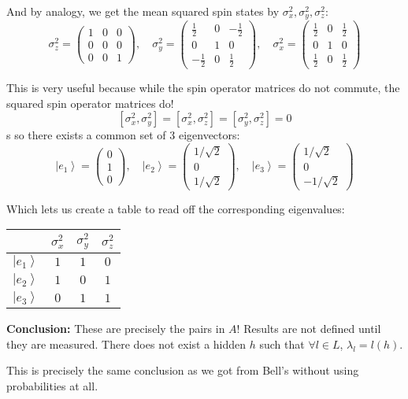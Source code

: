 \documentclass[12pt]{article}
\newcommand{\ket}[1]{\left\vert #1 \right\rangle}
\begin{document}
        And by analogy, we get the mean squared spin states by $\sigma_x^2, \sigma_y^2, \sigma_z^2$: 
        \[\sigma_z^2 = \begin{pmatrix}
            1 & 0 & 0\\
            0 & 0 & 0\\
            0 & 0 & 1
        \end{pmatrix}, \quad \sigma_y^2 = \begin{pmatrix}
            \frac{1}{2} & 0 & -\frac{1}{2}\\
            0 & 1 & 0\\
            -\frac{1}{2} & 0 & \frac{1}{2}
        \end{pmatrix}, \quad \sigma_x^2 = \begin{pmatrix}
            \frac{1}{2} & 0 & \frac{1}{2}\\
            0 & 1 & 0\\
            \frac{1}{2} & 0 & \frac{1}{2}
        \end{pmatrix}\]

        This is very useful because while the spin operator matrices do not commute, the squared spin operator matrices do!
        \[[\sigma^2_x, \sigma^2_y] = [\sigma^2_x, \sigma^2_z] = [\sigma^2_y, \sigma^2_z] = 0\]s
        so there exists a common set of $3$ eigenvectors: 
        \[\ket{e_1} = \begin{pmatrix}
            0\\1\\0
        \end{pmatrix}, \quad \ket{e_2} = \begin{pmatrix}
            1/\sqrt 2\\0\\1/\sqrt 2
        \end{pmatrix}, \quad \ket{e_3} =  \begin{pmatrix}
            1/\sqrt 2\\0\\ -1/\sqrt 2
        \end{pmatrix}\]

        Which lets us create a table to read off the corresponding eigenvalues:
        \begin{center}
            \begin{tabular*}{1.28in}{|c|ccc|}
                \hline 
                & $\sigma_x^2$ & $\sigma_y^2$ & $\sigma_z^2$\\
                \hline
                $\ket{e_1}$ & $1$ & $1$ & $0$\\
                $\ket{e_2}$ & $1$ & $0$ & $1$\\
                $\ket{e_3}$ & $0$ & $1$ & $1$\\
                \hline
            \end{tabular*}
        \end{center}

        \textbf{Conclusion:} These are precisely the pairs in $A$! Results are not defined until they are measured. There does not exist a hidden $h$ such that $\forall l \in L$, $\lambda_l = l(h)$.

        This is precisely the same conclusion as we got from Bell's without using probabilities at all. 
\end{document}
